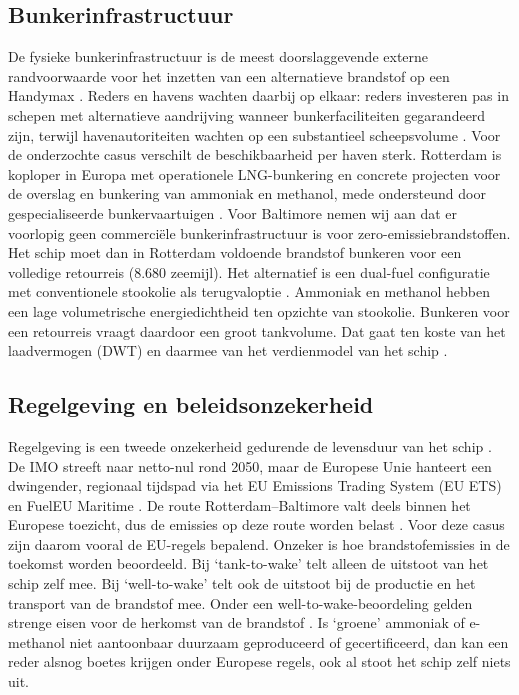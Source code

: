 \documentclass[a4paper]{IMDC2024}
\begin{document}
\subsection{Bunkerinfrastructuur}
De fysieke bunkerinfrastructuur is de meest doorslaggevende externe randvoorwaarde voor het inzetten van een alternatieve brandstof op een Handymax \citep{mckenney2024}. Reders en havens wachten daarbij op elkaar: reders investeren pas in schepen met alternatieve aandrijving wanneer bunkerfaciliteiten gegarandeerd zijn, terwijl havenautoriteiten wachten op een substantieel scheepsvolume \citep{vidovic2023}. Voor de onderzochte casus verschilt de beschikbaarheid per haven sterk. Rotterdam is koploper in Europa met operationele LNG-bunkering en concrete projecten voor de overslag en bunkering van ammoniak en methanol, mede ondersteund door gespecialiseerde bunkervaartuigen \citep{dahlkewallat2024}. Voor Baltimore nemen wij aan dat er voorlopig geen commerciële bunkerinfrastructuur is voor zero-emissiebrandstoffen. Het schip moet dan in Rotterdam voldoende brandstof bunkeren voor een volledige retourreis (8.680 zeemijl). Het alternatief is een dual-fuel configuratie met conventionele stookolie als terugvaloptie \citep{akman2024}. Ammoniak en methanol hebben een lage volumetrische energiedichtheid ten opzichte van stookolie. Bunkeren voor een retourreis vraagt daardoor een groot tankvolume. Dat gaat ten koste van het laadvermogen (DWT) en daarmee van het verdienmodel van het schip \citep{dimicco2024}.

\subsection{Regelgeving en beleidsonzekerheid}
Regelgeving is een tweede onzekerheid gedurende de levensduur van het schip \citep{mckenney2024}. De IMO streeft naar netto-nul rond 2050, maar de Europese Unie hanteert een dwingender, regionaal tijdspad via het EU Emissions Trading System (EU ETS) en FuelEU Maritime \citep{tadros2023}. De route Rotterdam--Baltimore valt deels binnen het Europese toezicht, dus de emissies op deze route worden belast \citep{charvalos2025}. Voor deze casus zijn daarom vooral de EU-regels bepalend. Onzeker is hoe brandstofemissies in de toekomst worden beoordeeld. Bij `tank-to-wake' telt alleen de uitstoot van het schip zelf mee. Bij `well-to-wake' telt ook de uitstoot bij de productie en het transport van de brandstof mee. Onder een well-to-wake-beoordeling gelden strenge eisen voor de herkomst van de brandstof \citep{tadros2023}. Is `groene' ammoniak of e-methanol niet aantoonbaar duurzaam geproduceerd of gecertificeerd, dan kan een reder alsnog boetes krijgen onder Europese regels, ook al stoot het schip zelf niets uit.
\end{document}
